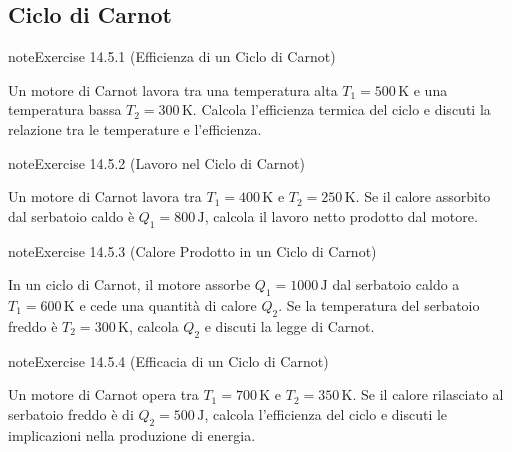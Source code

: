 \documentclass[letterpaper,10pt,italian]{jupyterBook}
\begin{document}
\subsection{Ciclo di Carnot}
\label{\detokenize{ch/thermodynamics/heat-engine-problems:ciclo-di-carnot}} \label{exercise:ch/thermodynamics/heat-engine-problems-exercise-0}

\begin{sphinxadmonition}{note}{Exercise 14.5.1 (Efficienza di un Ciclo di Carnot)}



\sphinxAtStartPar
Un motore di Carnot lavora tra una temperatura alta \(T_1 = 500 \, \text{K}\) e una temperatura bassa \(T_2 = 300 \, \text{K}\). Calcola l’efficienza termica del ciclo e discuti la relazione tra le temperature e l’efficienza.
\end{sphinxadmonition}
 \label{exercise:ch/thermodynamics/heat-engine-problems-exercise-1}

\begin{sphinxadmonition}{note}{Exercise 14.5.2 (Lavoro nel Ciclo di Carnot)}



\sphinxAtStartPar
Un motore di Carnot lavora tra \(T_1 = 400 \, \text{K}\) e \(T_2 = 250 \, \text{K}\). Se il calore assorbito dal serbatoio caldo è \(Q_1 = 800 \, \text{J}\), calcola il lavoro netto prodotto dal motore.
\end{sphinxadmonition}
 \label{exercise:ch/thermodynamics/heat-engine-problems-exercise-2}

\begin{sphinxadmonition}{note}{Exercise 14.5.3 (Calore Prodotto in un Ciclo di Carnot)}



\sphinxAtStartPar
In un ciclo di Carnot, il motore assorbe \(Q_1 = 1000 \, \text{J}\) dal serbatoio caldo a \(T_1 = 600 \, \text{K}\) e cede una quantità di calore \(Q_2\). Se la temperatura del serbatoio freddo è \(T_2 = 300 \, \text{K}\), calcola \(Q_2\) e discuti la legge di Carnot.
\end{sphinxadmonition}
 \label{exercise:ch/thermodynamics/heat-engine-problems-exercise-3}

\begin{sphinxadmonition}{note}{Exercise 14.5.4 (Efficacia di un Ciclo di Carnot)}



\sphinxAtStartPar
Un motore di Carnot opera tra \(T_1 = 700 \, \text{K}\) e \(T_2 = 350 \, \text{K}\). Se il calore rilasciato al serbatoio freddo è di \(Q_2 = 500 \, \text{J}\), calcola l’efficienza del ciclo e discuti le implicazioni nella produzione di energia.
\end{sphinxadmonition}
 \label{exercise:ch/thermodynamics/heat-engine-problems-exercise-4}
\end{document}
